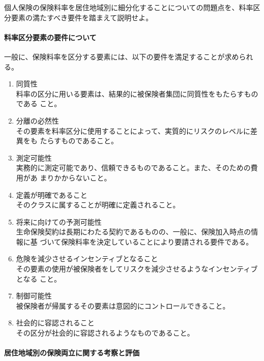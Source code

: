 \documentclass[report,gutter=10mm,fore-edge=10mm,uplatex,dvipdfmx]{jlreq}
\begin{document}

個人保険の保険料率を居住地域別に細分化することについての問題点を、料率区分要素の満たすべき要件を踏まえて説明せよ。


\paragraph{料率区分要素の要件について}
一般に、保険料率を区分する要素には、以下の要件を満足することが求められる。
\begin{enumerate}
\tightlist
\item
  同質性\\
料率の区分に用いる要素は、結果的に被保険者集団に同質性をもたらすものである
こと。
\item
  分離の必然性\\
その要素を料率区分に使用することによって、実質的にリスクのレベルに差異をも
たらすものであること。
\item
  測定可能性\\
実務的に測定可能であり、信頼できるものであること。また、そのための費用があ
まりかからないこと。
\item
  定義が明確であること\\
そのクラスに属することが明確に定義されること。
\item
  将来に向けての予測可能性\\
生命保険契約は長期にわたる契約であるものの、一般に、保険加入時点の情報に基
づいて保険料率を決定していることにより要請される要件である。
\item
  危険を減少させるインセンティブとなること\\
その要素の使用が被保険者をしてリスクを減少させるようなインセンティブとなる
こと。
\item
  制御可能性\\
被保険者が帰属するその要素は意図的にコントロールできること。
\item
  社会的に容認されること\\
その区分が社会的に容認されるようなものであること。
\end{enumerate}

\paragraph{居住地域別の保険両立に関する考察と評価}
\end{document}
